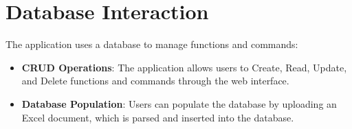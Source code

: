 \section{Database Interaction}
The application uses a database to manage functions and commands:
\begin{itemize}
	\item \textbf{CRUD Operations}: The application allows users to Create, Read, Update, and Delete functions and commands through the web interface.
	\item \textbf{Database Population}: Users can populate the database by uploading an Excel document, which is parsed and inserted into the database.
\end{itemize}

